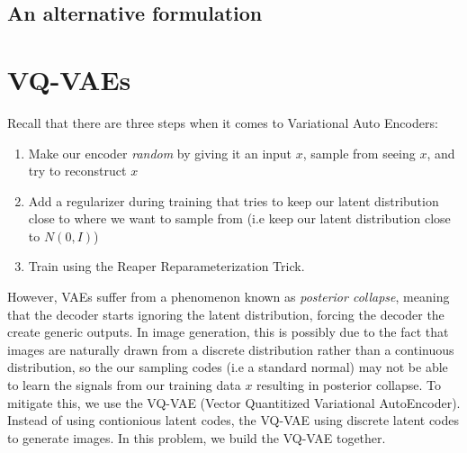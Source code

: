 \documentclass{article}
\begin{document}
\subsection{An alternative formulation}


\section{VQ-VAEs}
Recall that there are three steps when it comes to Variational Auto Encoders:
\begin{enumerate}
    \item Make our encoder \textit{random} by giving it an input $x$, sample from seeing $x$, and try to reconstruct $x$
    \item Add a regularizer during training that tries to keep our latent distribution close to where we want to sample from (i.e keep our latent distribution close to $N(0, I)$)
    \item Train using the Reaper Reparameterization Trick.
\end{enumerate}
However, VAEs suffer from a phenomenon known as \textit{posterior collapse}, meaning that the decoder starts ignoring the latent distribution, forcing the decoder the create generic outputs. In image generation, this is possibly due to the fact that images are naturally drawn from a discrete distribution rather than a continuous distribution, so the our sampling codes (i.e a standard normal) may not be able to learn the signals from our training data $x$ resulting in posterior collapse. To mitigate this, we use the VQ-VAE (Vector Quantitized Variational AutoEncoder). Instead of using contionious latent codes, the VQ-VAE using discrete latent codes to generate images. In this problem, we build the VQ-VAE together.
\end{document}
